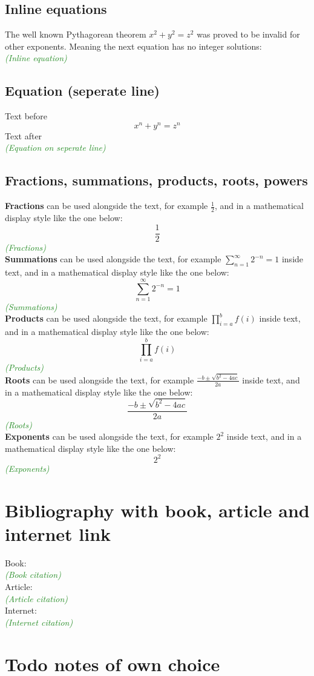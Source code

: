 \documentclass{article}
\newcommand{\ccheck}[1]{\textcolor{ForestGreen}{\emph{(\checkmark #1)}}} %
\begin{document}
\subsection{Inline equations}
The well known Pythagorean theorem \(x^2 + y^2 = z^2\) was 
proved to be invalid for other exponents. 
Meaning the next equation has no integer solutions:\\
\ccheck{Inline equation}

\subsection{Equation (seperate line)}
Text before
\[ x^n + y^n = z^n \]
Text after\\
\ccheck{Equation on seperate line}

\subsection{Fractions, summations, products, roots, powers}
\textbf{Fractions} can be used alongside the text, for 
example \( \frac{1}{2} \), and in a mathematical 
display style like the one below:
\[\frac{1}{2}\]
\ccheck{Fractions}\\

\textbf{Summations} can be used alongside the text, for 
example $\sum_{n=1}^{\infty} 2^{-n} = 1$ inside text, and in a mathematical 
display style like the one below:
\[ \sum_{n=1}^{\infty} 2^{-n} = 1 \]
\ccheck{Summations}\\

\textbf{Products} can be used alongside the text, for 
example $\prod_{i=a}^{b} f(i)$ inside text, and in a mathematical 
display style like the one below:
\[ \prod_{i=a}^{b} f(i) \]
\ccheck{Products}\\

\textbf{Roots} can be used alongside the text, for 
example $\frac{-b \pm \sqrt{b^2 - 4ac}}{2a}$ inside text, and in a mathematical 
display style like the one below:
\[ \frac{-b \pm \sqrt{b^2 - 4ac}}{2a} \]
\ccheck{Roots}\\

\textbf{Exponents} can be used alongside the text, for 
example ${2^2}$ inside text, and in a mathematical 
display style like the one below:
\[ {2^2} \]
\ccheck{Exponents}\\


\section{Bibliography with book, article and internet link}
Book: \cite{bookbib}\\ \ccheck{Book citation}\\
Article: \cite{articlebib}\\ \ccheck{Article citation}\\
Internet: \cite{internetbib}\\ \ccheck{Internet citation}\\


 

\section{Todo notes of own choice}

\end{document}
